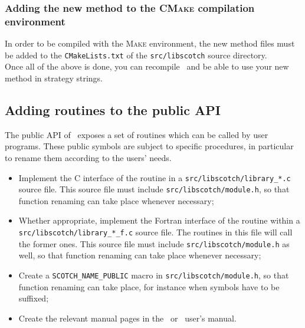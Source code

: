 \subsubsection{Adding the new method to the \textsc{CMake} compilation environment}

In order to be compiled with the \textsc{Make} environment, the new
method files must be added to the \texttt{CMakeLists.txt} of the
\texttt{src/\lbt libscotch} source directory.
\\

Once all of the above is done, you can recompile \scotch\ and be able
to use your new method in strategy strings.

\subsection{Adding routines to the public API}
\label{sec-routine}

The public API of \scotch\ exposes a set of routines which can be
called by user programs. These public symbols are subject to specific
procedures, in particular to rename them according to the users'
needs.
\begin{itemize}
\item
Implement the C interface of the routine in a
\texttt{src/\lbt libscotch/\lbt library\_*.c} source file. This source
file must include \texttt{src/\lbt libscotch/\lbt module.h}\enspace,
so that function renaming can take place whenever necessary;
\item
Whether appropriate, implement the Fortran interface of the routine
within a \texttt{src/\lbt libscotch/\lbt library\_*\_f.c} source
file. The routines in this file will call the former ones. This source
file must include \texttt{src/\lbt libscotch/\lbt module.h} as well,
so that function renaming can take place whenever necessary;
\item
Create a \texttt{SCOTCH\_\lbt NAME\_\lbt PUBLIC} macro in
\texttt{src/\lbt libscotch/\lbt module.h}\enspace, so that function
renaming can take place, for instance when symbols have to be
suffixed;
\item
Create the relevant manual pages in the \scotch\ or \ptscotch\ user's
manual.
\end{itemize}
